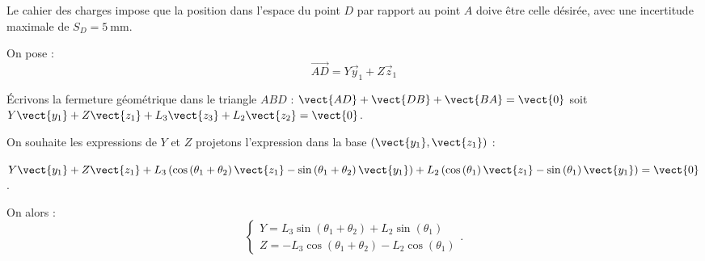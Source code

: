 \begin{obj}
Le cahier des charges impose que la position dans l'espace du point $D$ par rapport au point $A$ doive être celle désirée, avec une incertitude maximale de $S_{D}=5 \mathrm{~mm}$. 
\end{obj}
\ifprof
\else
On pose :
$$
\overrightarrow{A D}=Y \vec{y}_{1}+Z \vec{z}_{1}
$$
\fi
\ifprof
\begin{corrige}

\'Ecrivons la fermeture géométrique dans le triangle $ABD$ : $\vect{AD}+ \vect{DB}+\vect{BA} = \vect{0}$ soit $Y\vect{y_1}+Z\vect{z_1}+ L_3 \vect{z_3}+ L_2 \vect{z_2} = \vect{0}$.

On souhaite les expressions de $Y$ et $Z$ projetons l'expression dans la base $\left(\vect{y_1},\vect{z_1}\right)$ :

$Y\vect{y_1}+Z\vect{z_1}
+L_3 \left( \cos \left(\theta_1 + \theta_2 \right) \vect{z_1} - \sin \left(\theta_1 + \theta_2 \right) \vect{y_1}\right) 
+ L_2 \left( \cos \left(\theta_1 \right) \vect{z_1} - \sin \left(\theta_1  \right) \vect{y_1}\right)  = \vect{0}$.

On alors :
$$
\left\{
\begin{array}{l}
Y =  L_3 \sin  \left(\theta_1 + \theta_2 \right)  + L_2 \sin \left(\theta_1  \right) \\
Z =- L_3 \cos \left(\theta_1 + \theta_2 \right) - L_2 \cos \left(\theta_1 \right)  
\end{array}.
\right.
$$
\end{corrige}
\else
\fi

